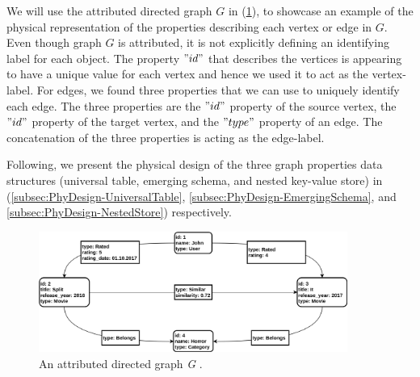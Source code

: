 {We will use the attributed directed graph $G$ in (\ref{fig:PropertyGraph_physical}), to showcase an example of the physical representation of the properties describing each vertex or edge in $G$. Even though graph $G$ is attributed, it is not explicitly defining an identifying label for each object. The property $"id"$ that describes the vertices is appearing to have a unique value for each vertex and hence we used it to act as the vertex-label. For edges, we found three properties that we can use to uniquely identify each edge. The three properties are the $"id"$ property of the source vertex, the $"id"$ property of the target vertex, and the $"type"$ property of an edge. The concatenation of the three properties is acting as the edge-label.

Following, we present the physical design of the three graph properties data structures (universal table, emerging schema, and nested key-value store) in (\ref{subsec:PhyDesign-UniversalTable}, \ref{subsec:PhyDesign-EmergingSchema}, and \ref{subsec:PhyDesign-NestedStore}) respectively.




\begin{figure}[H]
\centering
\includegraphics[width=0.9\textwidth]{pics/PropertyGraph.png}
\caption{An attributed directed graph \textit{G} \cite{DBLP:journals/corr/ParadiesLB14}.}
\label{fig:PropertyGraph_physical}
\end{figure} 







}
